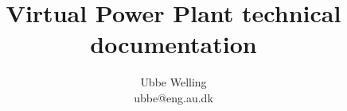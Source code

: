 \documentclass{report}
\begin{document}
\title{Virtual Power Plant technical documentation}
\author{Ubbe Welling\\ubbe@eng.au.dk}

\maketitle

\setcounter{tocdepth}{1}
\tableofcontents






\end{document}
